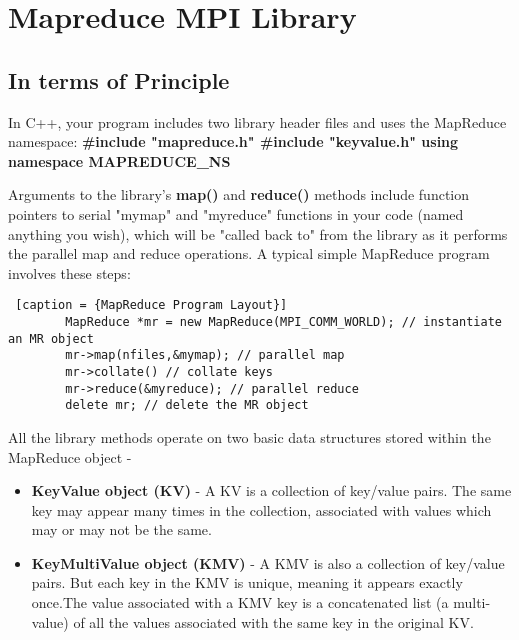 \documentclass{article}
\begin{document}
    \clearpage
    \section{Mapreduce MPI Library}
    
    \subsection{In terms of Principle}
     In C++, your program includes two library header files and uses the MapReduce namespace: \newline
     \newline
        \textbf{#include "mapreduce.h" \newline
        #include "keyvalue.h"   \newline
        using namespace MAPREDUCE\_NS   \newline}
        
    Arguments to the library's \textbf{map()} and \textbf{reduce()} methods include function pointers to serial "mymap" and "myreduce" functions in your code (named anything you wish), which will be "called back to" from the library as it performs the parallel map and reduce operations. \newline \newline
    A typical simple MapReduce program involves these steps: 
    
    \begin{lstlisting} [caption = {MapReduce Program Layout}]
        MapReduce *mr = new MapReduce(MPI_COMM_WORLD); // instantiate an MR object
        mr->map(nfiles,&mymap); // parallel map
        mr->collate() // collate keys
        mr->reduce(&myreduce); // parallel reduce
        delete mr; // delete the MR object
    \end{lstlisting}
    
    All the library methods operate on two basic data structures stored within the MapReduce object -
    \begin{itemize}
        \item
         \textbf{KeyValue object (KV)} - A KV is a collection of key/value pairs. The same key may appear many times in the collection, associated with values which may or may not be the same. 
        \item
        \textbf{KeyMultiValue object (KMV)} - A KMV is also a collection of key/value pairs. But each key in the KMV is unique, meaning it appears exactly once.The value associated with a KMV key is a concatenated list (a multi-value) of all the values associated with the same key in the original KV.
    \end{itemize}
     
\end{document}
